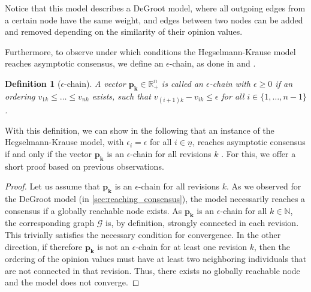 \documentclass[journal,compsoc,10pt]{IEEEtran}
\newcommand{\RR}{\mathbb{R}}
\newcommand{\NN}{\mathbb{N}}
\newcommand{\gG}{\mathcal{G}}
\renewcommand{\vec}[1]{\bm{#1}}        %
\newtheorem{definition}{Definition}[section]
\begin{document}
Notice that this model describes a DeGroot model, where all outgoing edges from a certain node have the same weight, and edges between two nodes can be added and removed depending on the similarity of their opinion values.

Furthermore, to observe under which conditions the Hegselmann-Krause model reaches asymptotic consensus, we define an $\epsilon$-chain, as done in \cite{Krause} and \cite{Dittmer}.

\begin{definition}[$\epsilon$-chain]
    A vector $\vec{p_k} \in \RR^n_+$ is called an $\epsilon$-chain with $\epsilon \geq 0$ if an ordering $v_{1k} \leq \dots \leq v_{nk}$ exists, such that $v_{(i+1)k} - v_{ik} \leq \epsilon$ for all $i \in \{1, \dots,n-1\}$.
\end{definition}

With this definition, we can show in the following that an instance of the Hegselmann-Krause model, with $\epsilon_i = \epsilon$ for all $i\in \underline{n}$, reaches asymptotic consensus if and only if the vector $\vec{p_k}$ is an $\epsilon$-chain for all revisions $k$ \cite{Krause}.
For this, we offer a short proof based on previous observations.

\begin{proof}
    Let us assume that $\vec{p_k}$ is an $\epsilon$-chain for all revisions $k$. As we observed for the DeGroot model (in \cref{sec:reaching_consensus}), the model necessarily reaches a consensus if a globally reachable node exists. As $\vec{p_k}$ is an $\epsilon$-chain for all $k \in \NN$, the corresponding graph $\gG$ is, by definition, strongly connected in each revision. This trivially satisfies the necessary condition for convergence. In the other direction, if therefore $\vec{p_k}$ is not an $\epsilon$-chain for at least one revision $k$, then the ordering of the opinion values must have at least two neighboring individuals that are not connected in that revision. Thus, there exists no globally reachable node and the model does not converge.
\end{proof}
\end{document}
